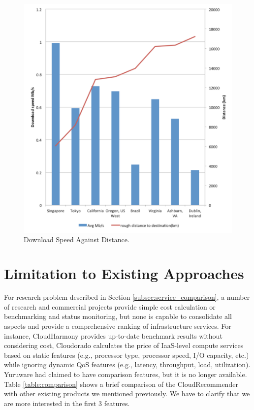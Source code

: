 \begin{figure}[!ht]
 \centering
 \includegraphics[width=\textwidth,keepaspectratio]{Figures/QoS/figure6.pdf}
 \caption{Download Speed Against Distance.}
\label{fig:DownloadSpeedAgainstDistance}
\end{figure}

\section{Limitation to Existing Approaches}
For research problem described in Section \ref{subsec:service_comparison}, a number of research \cite{Li2010} and commercial projects provide simple cost calculation or benchmarking and status monitoring, but none is capable to consolidate all aspects and provide a comprehensive ranking of infrastructure services.
For instance, CloudHarmony \cite{cloudharmony_speedtest} provides up-to-date benchmark results without considering cost, Cloudorado \cite{Cloudorado} calculates the price of IaaS-level compute services based on static features (e.g., processor type, processor speed, I/O capacity, etc.) while ignoring dynamic QoS features (e.g., latency, throughput, load, utilization).
Yuruware had claimed to have comparison features, but it is no longer available.
Table \ref{table:comparison} shows a brief comparison of the CloudRecommender with other existing products we mentioned previously. We have to clarify that we are more interested in the first 3 features.

